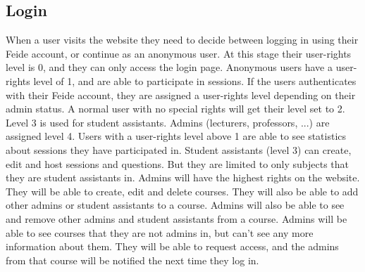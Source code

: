 \subsection{Login}
When a user visits the website they need to decide between logging in using their Feide account, or continue as an anonymous user. At this stage their user-rights level is 0, and they can only access the login page. Anonymous users have a user-rights level of 1, and are able to participate in sessions. If the users authenticates with their Feide account, they are assigned a user-rights level depending on their admin status. A normal user with no special rights will get their level set to 2. Level 3 is used for student assistants. Admins (lecturers, professors, ...) are assigned level 4. Users with a user-rights level above 1 are able to see statistics about sessions they have participated in. Student assistants (level 3) can create, edit and host sessions and questions. But they are limited to only subjects that they are student assistants in. Admins will have the highest rights on the website. They will be able to create, edit and delete courses. They will also be able to add other admins or student assistants to a course. Admins will also be able to see and remove other admins and student assistants from a course. Admins will be able to see courses that they are not admins in, but can't see any more information about them. They will be able to request access, and the admins from that course will be notified the next time they log in.
